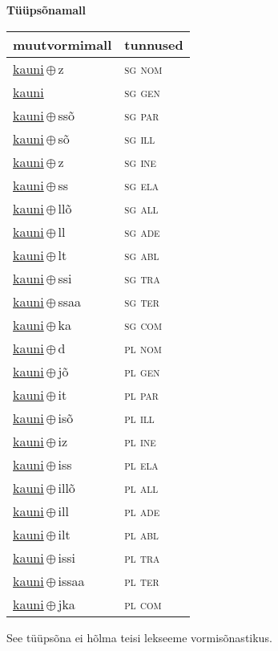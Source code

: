 

\vspace{3.5em}
\noindent \begin{minipage}{\textwidth}
\noindent \textbf{Tüüpsõnamall \,}\\

\begin{sideways}
\begin{tabular}{l l}
muutvormimall & tunnused \\
\hline
\underline{kauni}\,$\oplus$\,z & \textsc{ sg nom } \\
\underline{kauni} & \textsc{ sg gen } \\
\underline{kauni}\,$\oplus$\,ssõ & \textsc{ sg par } \\
\underline{kauni}\,$\oplus$\,sõ & \textsc{ sg ill } \\
\underline{kauni}\,$\oplus$\,z & \textsc{ sg ine } \\
\underline{kauni}\,$\oplus$\,ss & \textsc{ sg ela } \\
\underline{kauni}\,$\oplus$\,llõ & \textsc{ sg all } \\
\underline{kauni}\,$\oplus$\,ll & \textsc{ sg ade } \\
\underline{kauni}\,$\oplus$\,lt & \textsc{ sg abl } \\
\underline{kauni}\,$\oplus$\,ssi & \textsc{ sg tra } \\
\underline{kauni}\,$\oplus$\,ssaa & \textsc{ sg ter } \\
\underline{kauni}\,$\oplus$\,ka & \textsc{ sg com } \\
\underline{kauni}\,$\oplus$\,d & \textsc{ pl nom } \\
\underline{kauni}\,$\oplus$\,jõ & \textsc{ pl gen } \\
\underline{kauni}\,$\oplus$\,it & \textsc{ pl par } \\
\underline{kauni}\,$\oplus$\,isõ & \textsc{ pl ill } \\
\underline{kauni}\,$\oplus$\,iz & \textsc{ pl ine } \\
\underline{kauni}\,$\oplus$\,iss & \textsc{ pl ela } \\
\underline{kauni}\,$\oplus$\,illõ & \textsc{ pl all } \\
\underline{kauni}\,$\oplus$\,ill & \textsc{ pl ade } \\
\underline{kauni}\,$\oplus$\,ilt & \textsc{ pl abl } \\
\underline{kauni}\,$\oplus$\,issi & \textsc{ pl tra } \\
\underline{kauni}\,$\oplus$\,issaa & \textsc{ pl ter } \\
\underline{kauni}\,$\oplus$\,jka & \textsc{ pl com } \\
\end{tabular}
\end{sideways}
\label{tab:tüüpsõnamall-kauniz}

\end{minipage}

 
\vspace{1em}
\noindent See tüüpsõna ei hõlma teisi lekseeme vormi\-sõnastikus.
